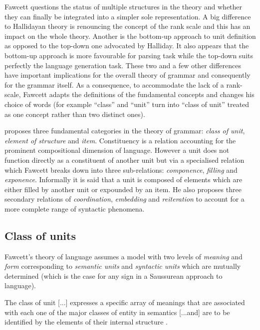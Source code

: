 Fawcett questions the status of multiple structures in the theory and whether they can finally be integrated into a simpler sole representation. A big difference to Hallidayan theory is renouncing the concept of the rank scale and this has an impact on the whole theory. Another is the bottom-up approach to unit definition as opposed to the top-down one advocated by Halliday. It also appears that the bottom-up approach is more favourable for parsing task while the top-down suits perfectly the language generation task. These two and a few other differences have important implications for the overall theory of grammar and consequently for the grammar itself. As a consequence, to accommodate the lack of a rank-scale, Fawcett adapts the definitions of the fundamental concepts and changes his choice of words (for example ``class'' and ``unit'' turn into ``class of unit'' treated as one concept rather than two distinct ones).

\citet{Fawcett2000} proposes three fundamental categories in the theory of grammar: \textit{class of unit}, \textit{element of structure} and \textit{item}. Constituency is a relation accounting for the prominent compositional dimension of language. However a unit does not function directly as a constituent of another unit but via a specialised relation which Fawcett breaks down into three sub-relations: \textit{componence}, \textit{filling} and \textit{exponence}. Informally it is said that a unit is composed of elements which are either filled by another unit or expounded by an item. He also proposes three secondary relations of \textit{coordination}, \textit{embedding} and \textit{reiteration} to account for a more complete range of syntactic phenomena.

\subsection{Class of units}
Fawcett's theory of language assumes a model with two levels of \textit{meaning} and \textit{form} corresponding to \textit{semantic units} and \textit{syntactic units} which are mutually determined (which is the case for any sign in a Saussurean approach to language). 

\begin{definition}\label{def:class2}
	The class of unit [...] expresses a specific array of meanings that are associated with each one of the major classes of entity in semantics [...and] are to be identified by the elements of their internal structure \citep[195]{Fawcett2000}. 
\end{definition}

